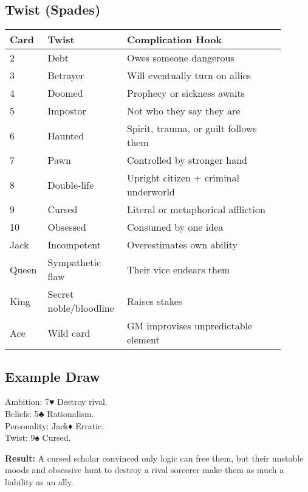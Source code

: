 \documentclass[12pt]{book}
\begin{document}
\subsection*{Twist (Spades)}
\begin{longtable}{|p{0.1\linewidth}|p{0.25\linewidth}|p{0.55\linewidth}|}
\hline
\textbf{Card} & \textbf{Twist} & \textbf{Complication Hook} \\
\hline
2 & Debt & Owes someone dangerous \\
3 & Betrayer & Will eventually turn on allies \\
4 & Doomed & Prophecy or sickness awaits \\
5 & Impostor & Not who they say they are \\
6 & Haunted & Spirit, trauma, or guilt follows them \\
7 & Pawn & Controlled by stronger hand \\
8 & Double-life & Upright citizen + criminal underworld \\
9 & Cursed & Literal or metaphorical affliction \\
10 & Obsessed & Consumed by one idea \\
Jack & Incompetent & Overestimates own ability \\
Queen & Sympathetic flaw & Their vice endears them \\
King & Secret noble/bloodline & Raises stakes \\
Ace & Wild card & GM improvises unpredictable element \\
\hline
\end{longtable}

\subsection*{Example Draw}
\noindent Ambition: 7♥ Destroy rival. \\
Beliefs: 5♣ Rationalism. \\
Personality: Jack♦ Erratic. \\
Twist: 9♠ Cursed. \\
\medskip

\noindent \textbf{Result:} A cursed scholar convinced only logic can free them, but their unstable moods and obsessive hunt to destroy a rival sorcerer make them as much a liability as an ally.
\end{document}
